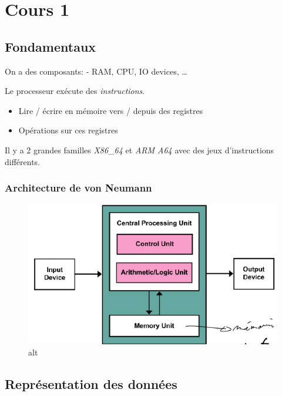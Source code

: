 \section{Cours 1}\label{cours-1}

\subsection{Fondamentaux}\label{fondamentaux}

On a des composants: - RAM, CPU, IO devices, \ldots{}

Le processeur exécute des \emph{instructions}.

\begin{itemize}
\tightlist
\item
  Lire / écrire en mémoire vers / depuis des registres
\item
  Opérations sur ces registres
\end{itemize}

Il y a 2 grandes familles \emph{X86\_64} et \emph{ARM A64} avec des jeux
d'instructions différents.

\subsubsection{Architecture de von
Neumann}\label{architecture-de-von-neumann}

\begin{figure}
\centering
\includegraphics{image-5.png}
\caption{alt}
\end{figure}

\subsection{Représentation des
données}\label{repruxe9sentation-des-donnuxe9es}

